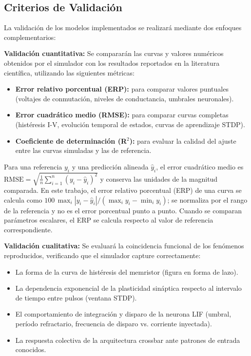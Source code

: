 \subsection{Criterios de Validación}

La validación de los modelos implementados se realizará mediante dos enfoques complementarios:

\textbf{Validación cuantitativa:} Se compararán las curvas y valores numéricos obtenidos por el simulador con los resultados reportados en la literatura científica, utilizando las siguientes métricas:
\begin{itemize}
\item \textbf{Error relativo porcentual (ERP):} para comparar valores puntuales (voltajes de conmutación, niveles de conductancia, umbrales neuronales).
\item \textbf{Error cuadrático medio (RMSE):} para comparar curvas completas (histéresis I-V, evolución temporal de estados, curvas de aprendizaje STDP).
\item \textbf{Coeficiente de determinación (R$^2$):} para evaluar la calidad del ajuste entre las curvas simuladas y las de referencia.
\end{itemize}

Para una referencia $y_i$ y una predicción alineada $\hat y_i$, el error
cuadrático medio es
$\mathrm{RMSE}=\sqrt{\frac{1}{n}\sum_{i=1}^{n}(y_i-\hat y_i)^2}$ y conserva
las unidades de la magnitud comparada. En este trabajo, el error relativo
porcentual (ERP) de una curva se calcula como
$100\,\max_i|y_i-\hat y_i|/(\max_i y_i-\min_i y_i)$; se normaliza por el
rango de la referencia y no es el error porcentual punto a punto. Cuando
se comparan parámetros escalares, el ERP se calcula respecto al valor de
referencia correspondiente.

\textbf{Validación cualitativa:} Se evaluará la coincidencia funcional de los fenómenos reproducidos, verificando que el simulador capture correctamente:
\begin{itemize}
\item La forma de la curva de histéresis del memristor (figura en forma de lazo).
\item La dependencia exponencial de la plasticidad sináptica respecto al intervalo de tiempo entre pulsos (ventana STDP).
\item El comportamiento de integración y disparo de la neurona LIF (umbral, período refractario, frecuencia de disparo vs. corriente inyectada).
\item La respuesta colectiva de la arquitectura crossbar ante patrones de entrada conocidos.
\end{itemize}

